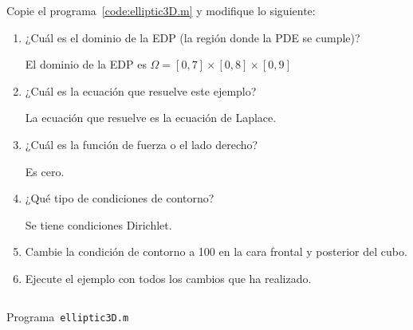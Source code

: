 \begin{problem}
Copie el programa~\ref{code:elliptic3D.m} y modifique lo siguiente:

\begin{enumerate}
      \item

            ¿Cuál es el dominio de la EDP (la región donde la PDE se cumple)?

            \begin{solution}
                  El dominio de la EDP es
                  \begin{math}
                        \Omega=
                        \left[
                              0,7
                              \right]\times
                        \left[
                              0,8
                              \right]\times
                        \left[
                              0,9
                              \right]
                  \end{math}
            \end{solution}

      \item

            ¿Cuál es la ecuación que resuelve este ejemplo?

            \begin{solution}
                  La ecuación que resuelve es la ecuación de Laplace.
            \end{solution}

      \item

            ¿Cuál es la función de fuerza o el lado derecho?

            \begin{solution}
                  Es cero.
            \end{solution}

      \item

            ¿Qué tipo de condiciones de contorno?

            \begin{solution}
                  Se tiene condiciones Dirichlet.
            \end{solution}

      \item

            Cambie la condición de contorno a 100 en la cara frontal y posterior del cubo.

            \begin{solution}
            \end{solution}

      \item

            Ejecute el ejemplo con todos los cambios que ha realizado.

            \begin{solution}
            \end{solution}
\end{enumerate}
\end{problem}

\begin{listing}[ht!]
      \tiny
      \centering
      \inputminted[frame=single,framesep=10pt,linenos,firstline=1,lastline=38,highlightlines={14,15}]{octave}{../examples/octave/elliptic3D.m}
      \caption{Programa~\texttt{elliptic3D.m}}
      \label{code:elliptic3D.m}
\end{listing}